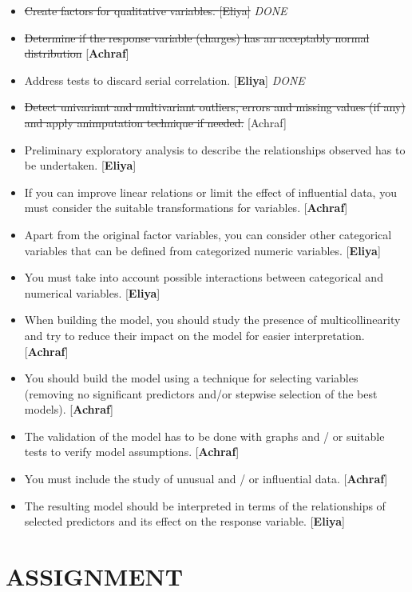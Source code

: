 \documentclass[
]{article}
\begin{document}
\begin{itemize}
\item
  \sout{Create factors for qualitative variables. {[}Eliya{]}}
  \emph{DONE}
\item
  \sout{Determine if the response variable (charges) has an acceptably
  normal distribution} {[}\textbf{Achraf}{]}
\item
  Address tests to discard serial correlation. {[}\textbf{Eliya}{]}
  \emph{DONE}
\item
  \sout{Detect univariant and multivariant outliers, errors and missing
  values (if any) and apply animputation technique if needed.}
  {[}Achraf{]}
\item
  Preliminary exploratory analysis to describe the relationships
  observed has to be undertaken. {[}\textbf{Eliya}{]}
\item
  If you can improve linear relations or limit the effect of influential
  data, you must consider the suitable transformations for variables.
  {[}\textbf{Achraf}{]}
\item
  Apart from the original factor variables, you can consider other
  categorical variables that can be defined from categorized numeric
  variables. {[}\textbf{Eliya}{]}
\item
  You must take into account possible interactions between categorical
  and numerical variables. {[}\textbf{Eliya}{]}
\item
  When building the model, you should study the presence of
  multicollinearity and try to reduce their impact on the model for
  easier interpretation. {[}\textbf{Achraf}{]}
\item
  You should build the model using a technique for selecting variables
  (removing no significant predictors and/or stepwise selection of the
  best models). {[}\textbf{Achraf}{]}
\item
  The validation of the model has to be done with graphs and / or
  suitable tests to verify model assumptions. {[}\textbf{Achraf}{]}
\item
  You must include the study of unusual and / or influential data.
  {[}\textbf{Achraf}{]}
\item
  The resulting model should be interpreted in terms of the
  relationships of selected predictors and its effect on the response
  variable. {[}\textbf{Eliya}{]}
\end{itemize}

\hypertarget{assignment}{%
\section{ASSIGNMENT}\label{assignment}}
\end{document}

